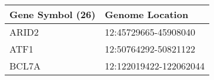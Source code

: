 \begin{tabular}{ll}
\toprule
Gene Symbol (26) &        Genome Location \\
\midrule
           ARID2 &   12:45729665-45908040 \\
            ATF1 &   12:50764292-50821122 \\
           BCL7A & 12:122019422-122062044 \\
\bottomrule
\end{tabular}
